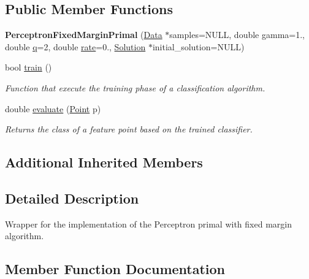 \subsection*{Public Member Functions}
\begin{DoxyCompactItemize}
\item 
\mbox{\label{class_perceptron_fixed_margin_primal_a2128977635875acf812b693df741baf8}} 
{\bfseries Perceptron\+Fixed\+Margin\+Primal} (\hyperlink{class_data}{Data} $\ast$samples=N\+U\+LL, double gamma=1., double \hyperlink{class_primal_classifier_a746ad2ff93fb77d82ae389f90dbdc89e}{q}=2, double \hyperlink{class_classifier_af9867e5919742de1303dd971a9a1c19a}{rate}=0., \hyperlink{class_solution}{Solution} $\ast$initial\+\_\+solution=N\+U\+LL)
\item 
bool \hyperlink{class_perceptron_fixed_margin_primal_ad41c2a42c4a819c03bf9879110b0f99f}{train} ()
\begin{DoxyCompactList}\small\item\em Function that execute the training phase of a classification algorithm. \end{DoxyCompactList}\item 
double \hyperlink{class_perceptron_fixed_margin_primal_af72c3dde96f1f1b803c7b522b5c1cc0f}{evaluate} (\hyperlink{class_point}{Point} p)
\begin{DoxyCompactList}\small\item\em Returns the class of a feature point based on the trained classifier. \end{DoxyCompactList}\end{DoxyCompactItemize}
\subsection*{Additional Inherited Members}


\subsection{Detailed Description}
Wrapper for the implementation of the Perceptron primal with fixed margin algorithm. 

\subsection{Member Function Documentation}
\mbox{\label{class_perceptron_fixed_margin_primal_af72c3dde96f1f1b803c7b522b5c1cc0f}} 
